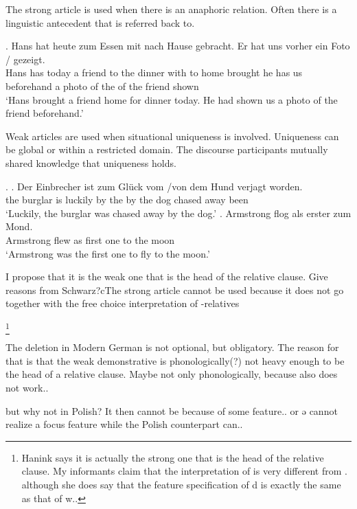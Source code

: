 The strong article is used when there is an anaphoric relation. Often there is a linguistic antecedent that is referred back to.

\exg. Hans hat heute   zum Essen mit nach Hause gebracht. Er hat uns vorher ein Foto /    gezeigt.\\
Hans has today a friend {to the} dinner with to home brought he has us beforehand a photo {of the} of the friend shown\\
`Hans brought a friend home for dinner today. He had shown us a photo of the friend beforehand.'

Weak articles are used when situational uniqueness is involved. Uniqueness can be global or within a restricted domain. The discourse participants mutually shared knowledge that uniqueness holds.

\ex.
\ag. Der Einbrecher ist {zum Glück} vom /von dem Hund verjagt worden.\\
the burglar is luckily {by the} by the dog {chased away} been\\
`Luckily, the burglar was chased away by the dog.'
\bg. Armstrong flog als erster zum Mond.\\
Armstrong flew as {first one} {to the} moon\\
`Armstrong was the first one to fly to the moon.' 



I propose that it is the weak one that is the head of the relative clause. Give reasons from Schwarz?cThe strong article cannot be used because it does not go together with the free choice interpretation of -relatives

\footnote{
Hanink says it is actually the strong one that is the head of the relative clause. My informants claim that the interpretation of   is very different from . although she does say that the feature specification of d is exactly the same as that of w..
}

The deletion in Modern German is not optional, but obligatory. The reason for that is that the weak demonstrative is phonologically(?) not heavy enough to be the head of a relative clause. Maybe not only phonologically, because  also does not work..


but why not in Polish? It then cannot be because of some feature.. or ə cannot realize a focus feature while the Polish counterpart can..

